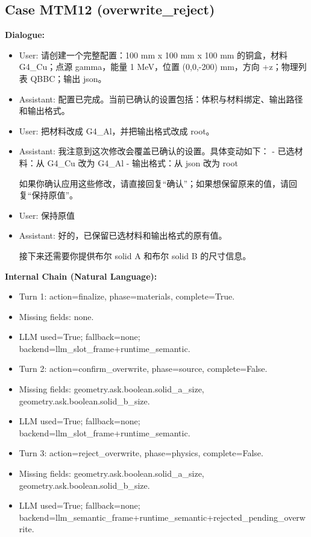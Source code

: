 \documentclass[11pt]{ctexart}
\begin{document}
\subsection{Case MTM12 (overwrite\_reject)}
\textbf{Dialogue:}
\begin{itemize}
\item User: 请创建一个完整配置：100 mm x 100 mm x 100 mm 的铜盒，材料 G4\_Cu；点源 gamma，能量 1 MeV，位置 (0,0,-200) mm，方向 +z；物理列表 QBBC；输出 json。
\item Assistant: 配置已完成。当前已确认的设置包括：体积与材料绑定、输出路径和输出格式。
\item User: 把材料改成 G4\_Al，并把输出格式改成 root。
\item Assistant: 我注意到这次修改会覆盖已确认的设置。具体变动如下：  
- 已选材料：从 G4\_Cu 改为 G4\_Al  
- 输出格式：从 json 改为 root  

如果你确认应用这些修改，请直接回复“确认”；如果想保留原来的值，请回复“保持原值”。
\item User: 保持原值
\item Assistant: 好的，已保留已选材料和输出格式的原有值。

接下来还需要你提供布尔 solid A 和布尔 solid B 的尺寸信息。
\end{itemize}
\textbf{Internal Chain (Natural Language):}
\begin{itemize}
\item Turn 1: action=finalize, phase=materials, complete=True.
\item Missing fields: none.
\item LLM used=True; fallback=none; backend=llm\_slot\_frame+runtime\_semantic.
\item Turn 2: action=confirm\_overwrite, phase=source, complete=False.
\item Missing fields: geometry.ask.boolean.solid\_a\_size, geometry.ask.boolean.solid\_b\_size.
\item LLM used=True; fallback=none; backend=llm\_slot\_frame+runtime\_semantic.
\item Turn 3: action=reject\_overwrite, phase=physics, complete=False.
\item Missing fields: geometry.ask.boolean.solid\_a\_size, geometry.ask.boolean.solid\_b\_size.
\item LLM used=True; fallback=none; backend=llm\_semantic\_frame+runtime\_semantic+rejected\_pending\_overwrite.
\end{itemize}
\end{document}
